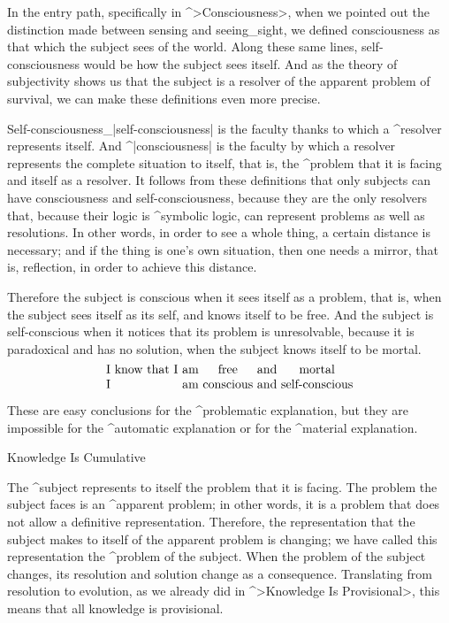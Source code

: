 In the entry path, specifically in ^>Consciousness>, when we pointed out
the distinction made between sensing and seeing_{sight}, we defined
consciousness as that which the subject sees of the world. Along these
same lines, self-consciousness would be how the subject sees itself. And
as the theory of subjectivity shows us that the subject is a resolver of
the apparent problem of survival, we can make these definitions even
more precise.

Self-consciousness_|self-consciousness| is the faculty thanks to which a
^{resolver} represents itself. And ^|consciousness| is the faculty by
which a resolver represents the complete situation to itself, that is,
the ^{problem} that it is facing and itself as a resolver. It follows
from these definitions that only subjects can have consciousness and
self-consciousness, because they are the only resolvers that, because
their logic is ^{symbolic logic}, can represent problems as well as
resolutions. In other words, in order to see a whole thing, a certain
distance is necessary; and if the thing is one's own situation, then one
needs a mirror, that is, reflection, in order to achieve this distance.

Therefore the subject is conscious when it sees itself as a problem,
that is, when the subject sees itself as its self, and knows itself to
be free. And the subject is self-conscious when it notices that its
problem is unresolvable, because it is paradoxical and has no solution,
when the subject knows itself to be mortal.
$$\vbox{\halign{&\hfil#\hfil\cr
  I &know that I &am & free & and & mortal\cr
  I &&am & conscious & and & self-conscious\cr}}$$

These are easy conclusions for the ^{problematic explanation}, but they
are impossible for the ^{automatic explanation} or for the ^{material
explanation}.


\Section Knowledge Is Cumulative

The ^{subject} represents to itself the problem that it is facing. The
problem the subject faces is an ^{apparent problem}; in other words, it
is a problem that does not allow a definitive representation. Therefore,
the representation that the subject makes to itself of the apparent
problem is changing; we have called this representation the ^{problem of
the subject}. When the problem of the subject changes, its resolution
and solution change as a consequence. Translating from resolution to
evolution, as we already did in ^>Knowledge Is Provisional>, this means
that all knowledge is provisional.

